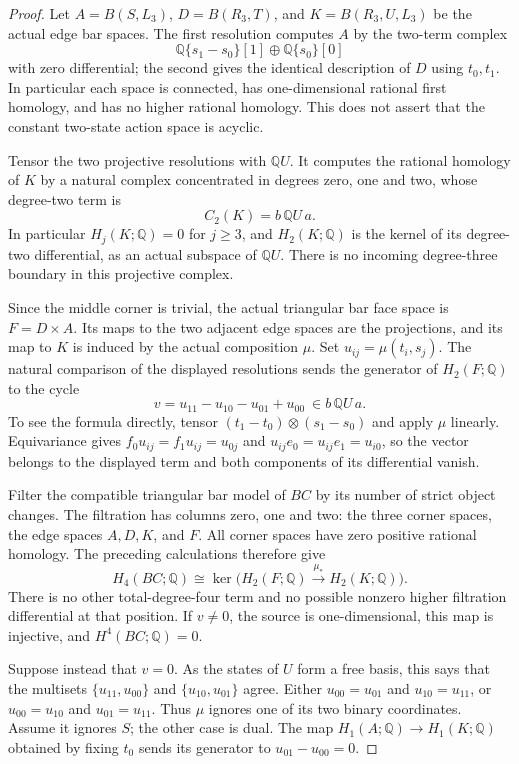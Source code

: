 \begin{proof}
Let $A=B(S,L_3)$, $D=B(R_3,T)$, and
$K=B(R_3,U,L_3)$ be the actual edge bar spaces. The first
resolution computes $A$ by the two-term complex
\[
 \mathbb Q\{s_1-s_0\}[1]\oplus\mathbb Q\{s_0\}[0]
\]
with zero differential; the second gives the identical
description of $D$ using $t_0,t_1$. In particular each space
is connected, has one-dimensional rational first homology,
and has no higher rational homology. This does not assert
that the constant two-state action space is acyclic.

Tensor the two projective resolutions with $\mathbb QU$.
It computes the rational homology of $K$ by a natural complex
concentrated in degrees zero, one and two, whose degree-two term is
\[
 C_2(K)=b\,\mathbb QU\,a.
\]
In particular $H_j(K;\mathbb Q)=0$ for $j\ge3$, and
$H_2(K;\mathbb Q)$ is the kernel of its degree-two differential,
as an actual subspace of $\mathbb QU$. There is no incoming
degree-three boundary in this projective complex.

Since the middle corner is trivial, the actual triangular
bar face space is $F=D\times A$. Its maps to the two adjacent
edge spaces are the projections, and its map to $K$ is induced
by the actual composition $\mu$. Set $u_{ij}=\mu(t_i,s_j)$.
The natural comparison of the displayed resolutions sends
the generator of $H_2(F;\mathbb Q)$ to the cycle
\[
 v=u_{11}-u_{10}-u_{01}+u_{00}\ \in b\,\mathbb QU\,a.
\]
To see the formula directly, tensor
$(t_1-t_0)\otimes(s_1-s_0)$ and apply $\mu$ linearly.
Equivariance gives $f_0u_{ij}=f_1u_{ij}=u_{0j}$ and
$u_{ij}e_0=u_{ij}e_1=u_{i0}$, so the vector belongs to the
displayed term and both components of its differential vanish.

Filter the compatible triangular bar model of $BC$ by its
number of strict object changes. The filtration has columns
zero, one and two: the three corner spaces, the edge spaces
$A,D,K$, and $F$. All corner spaces have zero positive
rational homology. The preceding calculations therefore give
\[
 H_4(BC;\mathbb Q)
   \cong\ker\bigl(H_2(F;\mathbb Q)
                    \xrightarrow{\mu_*}H_2(K;\mathbb Q)\bigr).
\]
There is no other total-degree-four term and no possible
nonzero higher filtration differential at that position.
If $v\ne0$, the source is one-dimensional, this map is
injective, and $H^4(BC;\mathbb Q)=0$.

Suppose instead that $v=0$. As the states of $U$ form a free
basis, this says that the multisets
$\{u_{11},u_{00}\}$ and $\{u_{10},u_{01}\}$ agree.
Either $u_{00}=u_{01}$ and $u_{10}=u_{11}$, or
$u_{00}=u_{10}$ and $u_{01}=u_{11}$.
Thus $\mu$ ignores one of its two binary coordinates.
Assume it ignores $S$; the other case is dual. The map
$H_1(A;\mathbb Q)\to H_1(K;\mathbb Q)$ obtained by
fixing $t_0$ sends its generator to $u_{01}-u_{00}=0$.


\end{proof}
